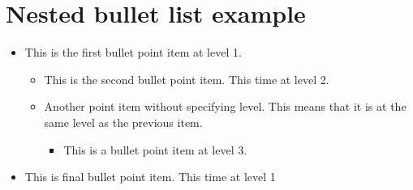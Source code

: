 \documentclass[a4paper]{report}
\begin{document}
\chapter{Nested bullet list example}
\begin{itemize}
\item This is the first bullet point item at level 1.
\begin{itemize}
\item This is the second bullet point item. This time at level 2.
\item Another point item without specifying level. This means that it is at the same level as the previous item.
\begin{itemize}
\item This is a bullet point item at level 3.
\end{itemize}
\end{itemize}
\item This is final bullet point item. This time at level 1
\end{itemize}
\end{document}
